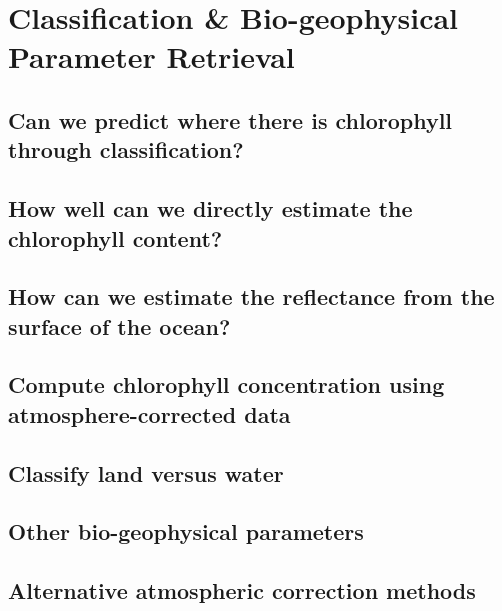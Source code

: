 \section{Classification \& Bio-geophysical Parameter Retrieval}

\subsection{Can we predict where there is chlorophyll through classification?}

\subsection{How well can we directly estimate the chlorophyll content?}

\subsection{How can we estimate the reflectance from the surface of the ocean?}

\subsection{Compute chlorophyll concentration using atmosphere-corrected data}

\subsection{Classify land versus water}

\subsection{Other bio-geophysical parameters}

\subsection{Alternative atmospheric correction methods}